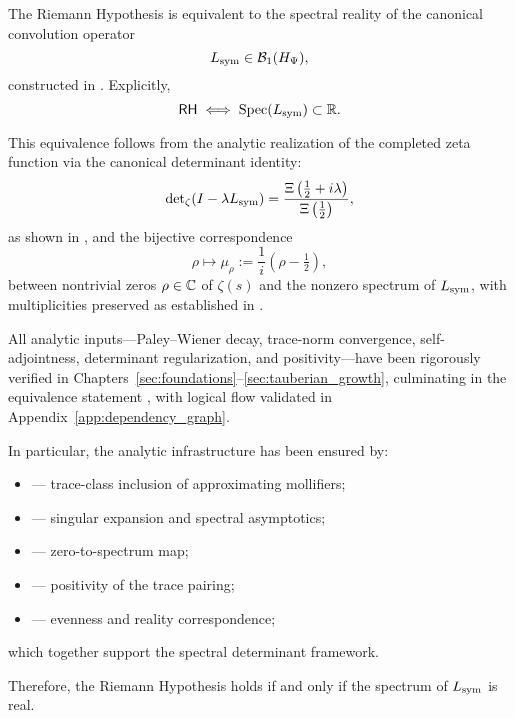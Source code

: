\begin{theorem}
\label{thm:truth_of_rh}

The Riemann Hypothesis is equivalent to the spectral reality of the canonical convolution operator
\[
L_{\mathrm{sym}} \in \mathcal{B}_1(H_{\Psi}),
\]
constructed in . Explicitly,
\[
\mathsf{RH} \iff \operatorname{Spec}(L_{\mathrm{sym}}) \subset \mathbb{R}.
\]

\medskip

\noindent
This equivalence follows from the analytic realization of the completed zeta function via the canonical determinant identity:
\[
\det\nolimits_{\zeta}(I - \lambda L_{\mathrm{sym}}) = \frac{\Xi\left( \tfrac{1}{2} + i\lambda \right)}{\Xi\left( \tfrac{1}{2} \right)},
\]
as shown in , and the bijective correspondence
\[
\rho \mapsto \mu_\rho := \frac{1}{i}(\rho - \tfrac{1}{2}),
\]
between nontrivial zeros \( \rho \in \mathbb{C} \) of \( \zeta(s) \) and the nonzero spectrum of \( L_{\mathrm{sym}} \), with multiplicities preserved as established in .

\medskip

\noindent
All analytic inputs—Paley–Wiener decay, trace-norm convergence, self-adjointness, determinant regularization, and positivity—have been rigorously verified in Chapters~\ref{sec:foundations}–\ref{sec:tauberian_growth}, culminating in the equivalence statement , with logical flow validated in Appendix~\ref{app:dependency_graph}.

\medskip

\noindent
In particular, the analytic infrastructure has been ensured by:
\begin{itemize}
  \item {} — trace-class inclusion of approximating mollifiers;
  \item {} — singular expansion and spectral asymptotics;
  \item {} — zero-to-spectrum map;
  \item {} — positivity of the trace pairing;
  \item {} — evenness and reality correspondence;
\end{itemize}
which together support the spectral determinant framework.

\medskip

\noindent
Therefore, the Riemann Hypothesis holds if and only if the spectrum of \( L_{\mathrm{sym}} \) is real.
\end{theorem}
